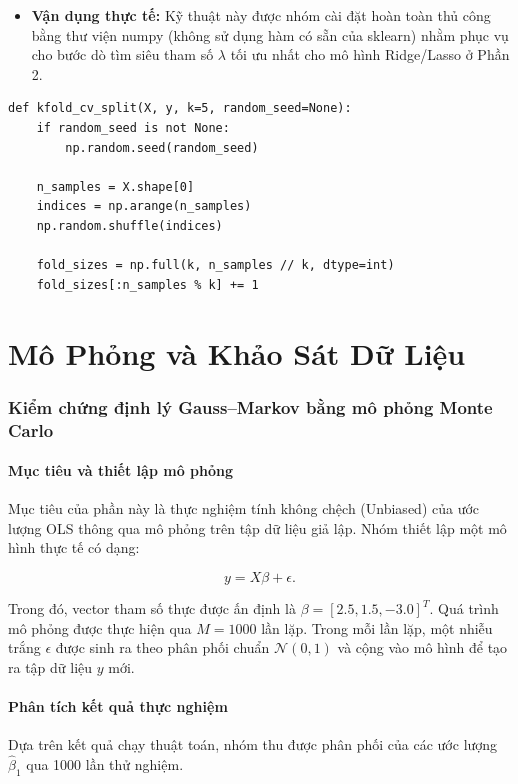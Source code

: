 \documentclass[12pt,a4paper]{article}
\begin{document}
\begin{itemize}
    \item \textbf{Vận dụng thực tế:} Kỹ thuật này được nhóm cài đặt hoàn toàn thủ công bằng thư viện numpy (không sử dụng hàm có sẵn của sklearn) nhằm phục vụ cho bước dò tìm siêu tham số $\lambda$ tối ưu nhất cho mô hình Ridge/Lasso ở Phần 2.
\end{itemize}

\begin{lstlisting}[caption={Hàm chia K-Fold cài đặt trong \texttt{part1/cross\_validation.py}}]
def kfold_cv_split(X, y, k=5, random_seed=None):
    if random_seed is not None:
        np.random.seed(random_seed)

    n_samples = X.shape[0]
    indices = np.arange(n_samples)
    np.random.shuffle(indices)

    fold_sizes = np.full(k, n_samples // k, dtype=int)
    fold_sizes[:n_samples % k] += 1
\end{lstlisting}

\part{Mô Phỏng và Khảo Sát Dữ Liệu}

\section{Kiểm chứng định lý Gauss--Markov bằng mô phỏng Monte Carlo}

\subsection{Mục tiêu và thiết lập mô phỏng}
Mục tiêu của phần này là thực nghiệm tính không chệch (Unbiased) của ước lượng OLS thông qua mô phỏng trên tập dữ liệu giả lập. Nhóm thiết lập một mô hình thực tế có dạng:
\begin{formulabox}
\begin{equation}
    y = X\beta + \epsilon.
\end{equation}
\end{formulabox}
Trong đó, vector tham số thực được ấn định là $\beta=[2.5,1.5,-3.0]^T$. Quá trình mô phỏng được thực hiện qua $M=1000$ lần lặp. Trong mỗi lần lặp, một nhiễu trắng $\epsilon$ được sinh ra theo phân phối chuẩn $\mathcal{N}(0,1)$ và cộng vào mô hình để tạo ra tập dữ liệu $y$ mới.

\subsection{Phân tích kết quả thực nghiệm}
Dựa trên kết quả chạy thuật toán, nhóm thu được phân phối của các ước lượng $\hat{\beta}_1$ qua 1000 lần thử nghiệm.
\end{document}
